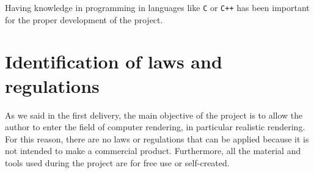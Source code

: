 \documentclass[titlepage,12pt]{article}
\begin{document}
Having knowledge in programming in languages like \texttt{C} or \texttt{C++} has been important for the proper development of the project.

\section{Identification of laws and regulations}

As we said in the first delivery, the main objective of the project is to allow the author to enter the field of computer rendering, in particular realistic rendering. For this reason, there are no laws or regulations that can be applied because it is not intended to make a commercial product. Furthermore, all the material and tools used during the project are for free use or self-created.


\newpage

\printbibliography

\listoffigures

\listoftables
\end{document}
